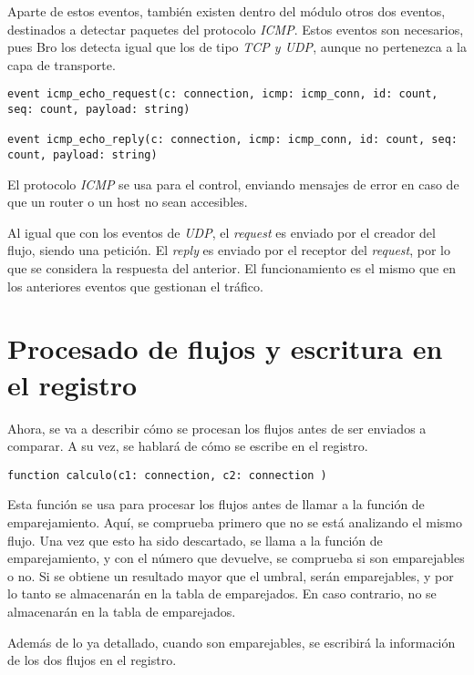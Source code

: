 \intro Aparte de estos eventos, también existen dentro del módulo otros dos eventos, destinados a detectar 
paquetes del protocolo \textit{ICMP}. Estos eventos son necesarios, pues Bro los detecta igual que los 
de tipo \textit{TCP y UDP}, aunque no pertenezca a la capa de transporte.

\begin{lstlisting}[style=CodigoC]
event icmp_echo_request(c: connection, icmp: icmp_conn, id: count, seq: count, payload: string)

event icmp_echo_reply(c: connection, icmp: icmp_conn, id: count, seq: count, payload: string)
\end{lstlisting}

\intro El protocolo \textit{ICMP} se usa para el control, enviando mensajes de error en caso de que un router o un host 
no sean accesibles.

\intro Al igual que con los eventos de \textit{UDP}, el \textit{request} es enviado por el creador del flujo, 
siendo una petición. El \textit{reply} es enviado por el receptor del \textit{request}, por lo que se considera 
la respuesta del anterior. El funcionamiento es el mismo que en los anteriores eventos que gestionan el tráfico.

\section{Procesado de flujos y escritura en el registro}

Ahora, se va a describir cómo se procesan los flujos antes de ser enviados a comparar. A su vez, se hablará de cómo se escribe en el 
registro.

\begin{lstlisting}[style=CodigoC]
function calculo(c1: connection, c2: connection )
\end{lstlisting}

\intro Esta función se usa para procesar los flujos antes de llamar a la función de emparejamiento. Aquí, se comprueba primero que no se está analizando el mismo flujo. Una vez que esto ha sido descartado, se llama a la función de emparejamiento, y con el número que devuelve, se comprueba si son emparejables o no. Si se obtiene un resultado mayor que el umbral, serán emparejables, y por lo tanto se almacenarán en la tabla de emparejados. En caso contrario, no se almacenarán en la tabla de emparejados.

\intro Además de lo ya detallado, cuando son emparejables, se escribirá la información de los dos flujos en el registro.

